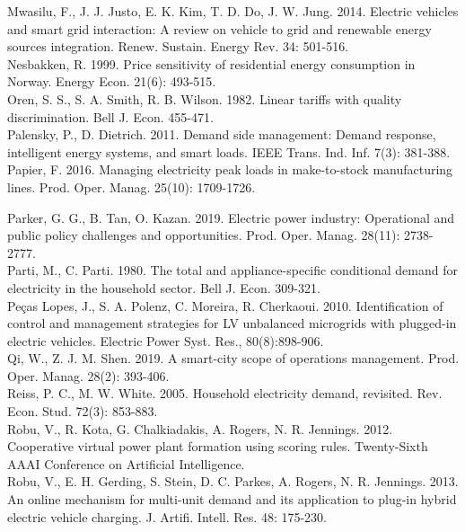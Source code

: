 \documentclass[10pt]{article}
\begin{document}
Mwasilu, F., J. J. Justo, E. K. Kim, T. D. Do, J. W. Jung. 2014. Electric vehicles and smart grid interaction: A review on vehicle to grid and renewable energy sources integration. Renew. Sustain. Energy Rev. 34: 501-516.\\
Nesbakken, R. 1999. Price sensitivity of residential energy consumption in Norway. Energy Econ. 21(6): 493-515.\\
Oren, S. S., S. A. Smith, R. B. Wilson. 1982. Linear tariffs with quality discrimination. Bell J. Econ. 455-471.\\
Palensky, P., D. Dietrich. 2011. Demand side management: Demand response, intelligent energy systems, and smart loads. IEEE Trans. Ind. Inf. 7(3): 381-388.\\
Papier, F. 2016. Managing electricity peak loads in make-to-stock manufacturing lines. Prod. Oper. Manag. 25(10): 1709-1726.

Parker, G. G., B. Tan, O. Kazan. 2019. Electric power industry: Operational and public policy challenges and opportunities. Prod. Oper. Manag. 28(11): 2738-2777.\\
Parti, M., C. Parti. 1980. The total and appliance-specific conditional demand for electricity in the household sector. Bell J. Econ. 309-321.\\
Peças Lopes, J., S. A. Polenz, C. Moreira, R. Cherkaoui. 2010. Identification of control and management strategies for LV unbalanced microgrids with plugged-in electric vehicles. Electric Power Syst. Res., 80(8):898-906.\\
Qi, W., Z. J. M. Shen. 2019. A smart-city scope of operations management. Prod. Oper. Manag. 28(2): 393-406.\\
Reiss, P. C., M. W. White. 2005. Household electricity demand, revisited. Rev. Econ. Stud. 72(3): 853-883.\\
Robu, V., R. Kota, G. Chalkiadakis, A. Rogers, N. R. Jennings. 2012. Cooperative virtual power plant formation using scoring rules. Twenty-Sixth AAAI Conference on Artificial Intelligence.\\
Robu, V., E. H. Gerding, S. Stein, D. C. Parkes, A. Rogers, N. R. Jennings. 2013. An online mechanism for multi-unit demand and its application to plug-in hybrid electric vehicle charging. J. Artifi. Intell. Res. 48: 175-230.
\end{document}
